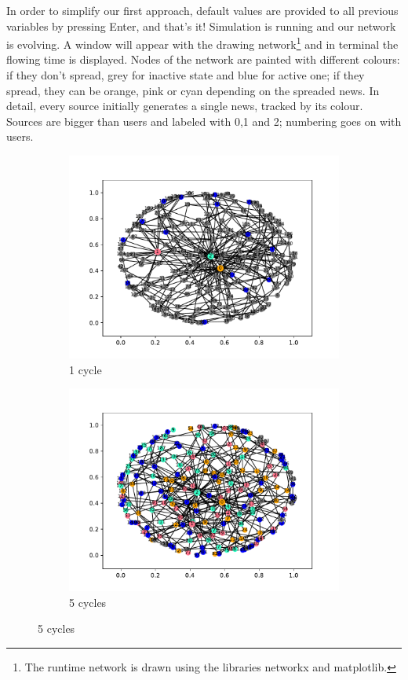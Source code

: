 In order to simplify our first approach, default values are provided to all previous variables by pressing Enter, and that's it!
Simulation is running and our network is evolving. A window will appear with the drawing network\footnote{The runtime network is drawn using the libraries networkx and matplotlib.} and in terminal the flowing time is displayed. 
Nodes of the network are painted with different colours: if they don't spread, grey for inactive state and blue for active one; if they spread, they can be orange, pink or cyan depending on the spreaded news. In detail, every source initially generates a single news, tracked by its colour. Sources are bigger than users and labeled with 0,1 and 2; numbering goes on with users.\\
\begin{figure}
  \centering
  \begin{subfigure}[t]{.45\textwidth}
    \centering
    \includegraphics[trim={1cm .5cm 1cm 1cm}, clip, width=\linewidth]{img/pdf/plot-0001.pdf} 
    \caption{1 cycle} \label{fig:100}
  \end{subfigure}
  \begin{subfigure}[t]{.45\textwidth}
    \centering
    \includegraphics[trim={1cm .5cm 1cm 1cm}, clip, width=\linewidth]{img/pdf/plot-0005.pdf} 
    \caption{5 cycles} \label{fig:200}
  \end{subfigure}


\end{figure}
